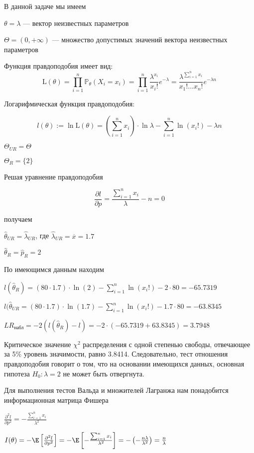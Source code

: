 \documentclass[pdftex,11pt,openany]{book}\usepackage[]{graphicx}\usepackage[]{color}
\begin{document}
\begin{solution}
В данной задаче мы имеем

$\theta = \lambda$ --- вектор неизвестных параметров

$\Theta = (0, +\infty)$ --- множество допустимых значений вектора неизвестных параметров

Функция правдоподобия имеет вид:
$$\text{L}(\theta) = \prod_{i=1}^n \mathbb{P}_{\theta}(X_i = x_i) = \prod_{i=1}^n \frac{\lambda^{x_i}}{x_i !} e^{-\lambda} = \frac{\lambda^{\sum_{i=1}^n x_i}}{x_1!\ldots x_n!}e^{-\lambda n}$$

Логарифмическая функция правдоподобия:

$$l(\theta) := \ln \text{L}(\theta) = \left( \sum_{i=1}^n x_i \right) \cdot \ln\lambda - \sum_{i=1}^n \ln (x_i!) - \lambda n$$

$\Theta_{UR} = \Theta$

$\Theta_{R} = \{2\}$

Решая уравнение правдоподобия

$$\frac{\partial l}{\partial p} = \frac{\sum_{i=1}^n x_i}{\lambda} - n = 0$$

получаем

$\hat{\theta}_{UR} = \hat{\lambda}_{UR}$, где $\hat{\lambda}_{UR} = \overline{x} = 1.7$

$\hat{\theta}_{R} = \hat{p}_{R} = 2$

По имеющимся данным находим

$l(\hat{\theta}_{R}) = (80 \cdot 1.7) \cdot \ln(2) - \sum_{i=1}^n \ln (x_i!) - 2 \cdot 80 = -65.7319$

$l(\hat{\theta}_{UR} = (80 \cdot 1.7) \cdot \ln(1.7) - \sum_{i=1}^n \ln (x_i!) - 1.7 \cdot 80 = -63.8345$

$LR_{\text{набл}} = -2(l(\hat{\theta}_{R}) - l) = -2 \cdot (-65.7319 + 63.8345) = 3.7948$

Критическое значение $\chi^2$ распределения с одной степенью свободы, отвечающее за 5\% уровень значимости, равно 3.8414. Следовательно, тест отношения правдоподобия говорит о том, что на основании имеющихся данных, основная гипотеза $H_0: \lambda = 2$ не может быть отвергнута.

Для выполнения тестов Вальда и множителей Лагранжа нам понадобится информационная матрица Фишера

$\frac{\partial^2 l}{\partial p^2} = - \frac{\sum_{i=1}^n x_i}{\lambda^2}$

$I(\theta) = -\E\left[ \frac{\partial^2 l}{\partial p^2} \right] = -\E \left[ - \frac{\sum_{i=1}^n x_i}{\lambda^2} \right] = -\left(-\frac{n\lambda}{\lambda^2}\right) = \frac{n}{\lambda}$


\end{solution}
\end{document}
